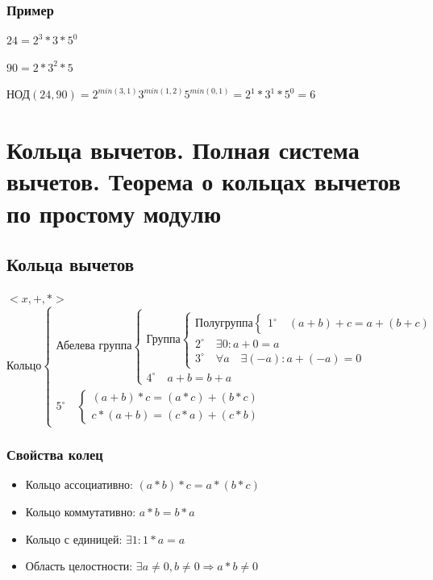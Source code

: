 \documentclass[12pt]{article}
\begin{document}
\subsubsection{Пример}
$24 = 2^3*3*5^0$ \par $90 = 2 * 3^2 *5$ \par
НОД$(24, 90) = 2^{min(3, 1)}3 ^{min(1, 2)}5^{min(0, 1)} = 2^1*3^1*5^0=6$

\section{Кольца вычетов. Полная система вычетов. Теорема о кольцах вычетов по простому модулю}
\subsection{Кольца вычетов}
$<x,+,*>$
\begin{equation*}
    \text{Кольцо}
    \begin{cases}
        \text{Абелева группа}
        \begin{cases}
            \text{Группа}
            \begin{cases}
                \text{Полугруппа}
                \begin{cases}
                    1^{\circ} \quad (a+b)+c = a+(b+c)
                \end{cases}
                \\
                2^{\circ} \quad \exists 0: a+0 = a
                \\
                3^{\circ} \quad \forall a \quad\exists (-a): a + (-a) = 0
            \end{cases}
            \\
            4^{\circ} \quad a + b = b + a
        \end{cases}
        \\
        5^{\circ} \quad \begin{cases}
                            (a+b)*c = (a*c) + (b*c)
                            \\
                            c*(a+b) = (c*a) + (c*b)
                        \end{cases}
    \end{cases}
\end{equation*}

\subsubsection{Свойства колец}
\begin{itemize}
    \item Кольцо ассоциативно: $(a*b)*c = a*(b*c)$
    \item Кольцо коммутативно: $a*b = b*a$
    \item Кольцо с единицей: $\exists 1: 1*a = a$
    \item Область целостности: $\exists a\ne 0, b \ne 0 \Rightarrow a*b \ne 0$
\end{itemize}
\end{document}
